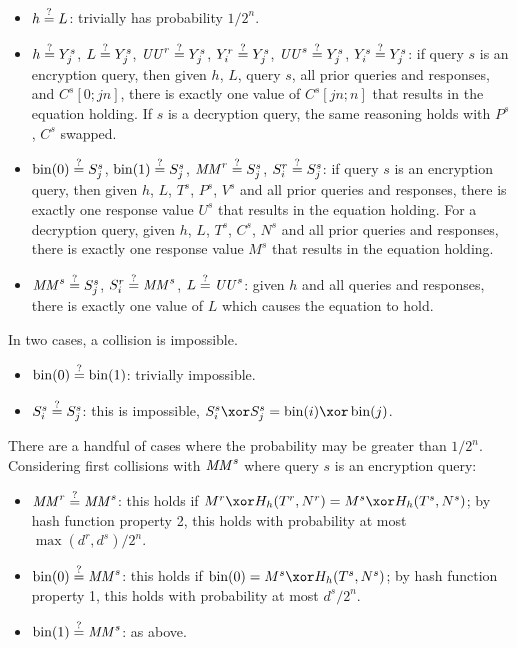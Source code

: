 \documentclass[hctr.tex]{subfiles}
\begin{document}
\begin{itemize}
    \item \(h \stackrel{\text{?}}{=} L\): trivially has probability \(1/2^n\).
    \item
    \(h \stackrel{\text{?}}{=} Y_j^s\),
    \(L \stackrel{\text{?}}{=} Y_j^s\),
    \(\mathit{UU}^r \stackrel{\text{?}}{=} Y_j^s\),
    \(Y_i^r \stackrel{\text{?}}{=} Y_j^s\),
    \(\mathit{UU}^s \stackrel{\text{?}}{=} Y_j^s\), 
    \(Y_i^s \stackrel{\text{?}}{=} Y_j^s\): 
    if query \(s\) is an encryption query,
    then given \(h\), \(L\), query \(s\), 
    all prior queries and responses, and
    \(C^s[0;jn]\), there is exactly one value of
    \(C^s[jn;n]\) that results in the equation holding.
    If \(s\) is a decryption query, the same reasoning holds
    with \(P^s\), \(C^s\) swapped.
    \item 
    \(\operatorname{bin}(0) \stackrel{\text{?}}{=} S_j^s\),
    \(\operatorname{bin}(1) \stackrel{\text{?}}{=} S_j^s\),
    \(\mathit{MM}^r \stackrel{\text{?}}{=} S_j^s\),
    \(S_i^r \stackrel{\text{?}}{=} S_j^s\):
    if query \(s\) is an encryption query,
    then given \(h\), \(L\), \(T^s\),
    \(P^s\), \(V^s\)
    and all prior queries and responses,
    there is exactly one response value \(U^s\)
    that results in the equation holding.
    For a decryption query, 
    given \(h\), \(L\), \(T^s\),
    \(C^s\), \(N^s\)
    and all prior queries and responses,
    there is exactly one response value \(M^s\)
    that results in the equation holding.
    \item
    \(\mathit{MM}^s \stackrel{\text{?}}{=} S_j^s\),
    \(S_i^r \stackrel{\text{?}}{=} \mathit{MM}^s\),
    \(L \stackrel{\text{?}}{=} \mathit{UU}^s\):
    given \(h\) and all queries and responses,
    there is exactly one value of \(L\)
    which causes the equation to hold.
\end{itemize}

In two cases, a collision is impossible.

\begin{itemize}
    \item \(\operatorname{bin}(0) \stackrel{\text{?}}{=} \operatorname{bin}(1)\): trivially impossible.
    \item 
    \(S_i^s \stackrel{\text{?}}{=} S_j^s\):
    this is impossible, 
    \(S_i^s \xor S_j^s = \fromint(i) \xor \fromint(j)\).
\end{itemize}

There are a handful of cases where the probability may
be greater than \(1/2^n\).
Considering first collisions with \(\mathit{MM}^s\) where
query \(s\) is an encryption query:

\begin{itemize}
    \item \(\mathit{MM}^r \stackrel{\text{?}}{=} \mathit{MM}^s\):
    this holds if \(M^r \xor H_h(T^r, N^r) = M^s \xor H_h(T^s, N^s)\);
    by hash function property 2, this holds with probability at most
    \(\max(d^r, d^s)/2^n\).
    \item \(\operatorname{bin}(0) \stackrel{\text{?}}{=} \mathit{MM}^s\):
    this holds if \(\fromint(0) = M^s \xor H_h(T^s, N^s)\);
    by hash function property 1, this holds with probability at most
    \(d^s/2^n\).
    \item \(\operatorname{bin}(1) \stackrel{\text{?}}{=} \mathit{MM}^s\): as above.
\end{itemize}
\end{document}
